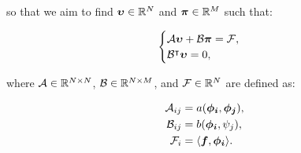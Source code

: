 so that we aim to find $\bm{\upsilon} \in \mathbb{R}^N$ and $\bm{\pi} \in \mathbb{R}^M$ such that:

\begin{gather} \label{matrix_stokes}
    \begin{cases}
        \mathcal{A} \bm{\upsilon} + \mathcal{B} \bm{\pi} = \mathcal{F}, \\
        \mathcal{B}^\intercal \bm{\upsilon} = 0,
    \end{cases}
\end{gather}

where $\mathcal{A} \in \mathbb{R}^{N \times N}$, $\mathcal{B} \in \mathbb{R}^{N \times M}$, and $\mathcal{F} \in \mathbb{R}^N$ are defined as:

\begin{align}
    \mathcal{A}_{ij} &= a(\bm{\phi_i}, \bm{\phi_j}), \\ 
    \mathcal{B}_{ij} &= b(\bm{\phi_i}, \psi_j), \\
    \mathcal{F}_i &= \langle \bm{f}, \bm{\phi_i} \rangle.
\end{align}